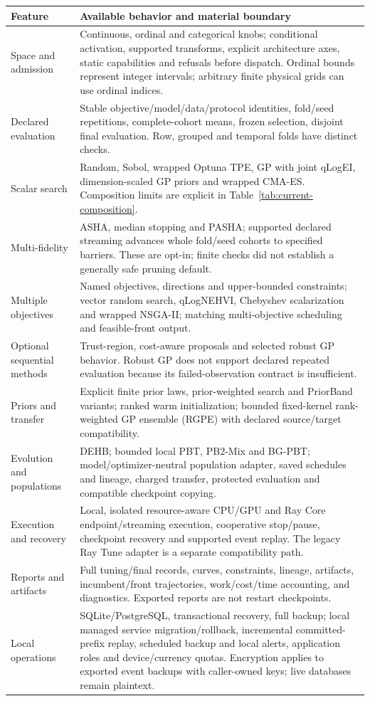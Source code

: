 \begin{longtable}{p{}p{}}
\toprule Feature & Available behavior and material boundary \\
\midrule\endhead
Space and admission & Continuous, ordinal and categorical knobs; conditional
activation, supported transforms, explicit architecture axes, static
capabilities and refusals before dispatch. Ordinal bounds represent integer
intervals; arbitrary finite physical grids can use ordinal indices. \\
Declared evaluation & Stable objective/model/data/protocol identities,
fold/seed repetitions, complete-cohort means, frozen selection, disjoint final
evaluation. Row, grouped and temporal folds have distinct checks. \\
Scalar search & Random, Sobol, wrapped Optuna TPE, GP with joint qLogEI,
dimension-scaled GP priors and wrapped CMA-ES. Composition limits are explicit
in Table~\ref{tab:current-composition}. \\
Multi-fidelity & ASHA, median stopping and PASHA; supported declared streaming
advances whole fold/seed cohorts to specified barriers. These are opt-in;
finite checks did not establish a generally safe pruning default. \\
Multiple objectives & Named objectives, directions and upper-bounded
constraints; vector random search, qLogNEHVI, Chebyshev scalarization and
wrapped NSGA-II; matching multi-objective scheduling and feasible-front output. \\
Optional sequential methods & Trust-region, cost-aware proposals and selected
robust GP behavior. Robust GP does not support declared repeated evaluation
because its failed-observation contract is insufficient. \\
Priors and transfer & Explicit finite prior laws, prior-weighted search and
PriorBand variants; ranked warm initialization; bounded fixed-kernel
rank-weighted GP ensemble (RGPE) with declared source/target compatibility. \\
Evolution and populations & DEHB; bounded local PBT, PB2-Mix and BG-PBT;
model/optimizer-neutral population adapter, saved schedules and lineage,
charged transfer, protected evaluation and compatible checkpoint copying. \\
Execution and recovery & Local, isolated resource-aware CPU/GPU and Ray Core endpoint/streaming execution,
cooperative stop/pause, checkpoint recovery and supported event replay. The
legacy Ray Tune adapter is a separate compatibility path. \\
Reports and artifacts & Full tuning/final records, curves, constraints,
lineage, artifacts, incumbent/front trajectories, work/cost/time accounting,
and diagnostics. Exported reports are not restart checkpoints. \\
Local operations & SQLite/PostgreSQL, transactional recovery, full backup;
local managed service migration/rollback, incremental committed-prefix replay,
scheduled backup and local alerts, application roles and device/currency
quotas. Encryption applies to exported event backups with caller-owned keys;
live databases remain plaintext. \\
\bottomrule
\end{longtable}

